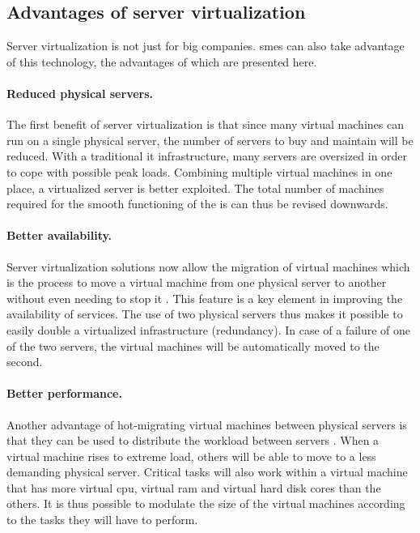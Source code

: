 \subsection{Advantages of server virtualization}
Server virtualization is not just for big companies. \acrshort{sme}s can also take advantage of this technology, the advantages of which are presented here.

\paragraph{Reduced physical servers.} The first benefit of server virtualization is that since many virtual machines can run on a single physical server, the number of servers to buy and maintain will be reduced. With a traditional \acrshort{it} infrastructure, many servers are oversized in order to cope with possible peak loads. Combining multiple virtual machines in one place, a virtualized server is better exploited. The total number of machines required for the smooth functioning of the \acrshort{is} can thus be revised downwards.

\paragraph{Better availability.} Server virtualization solutions now allow the migration of virtual machines which is the process to move a virtual machine from one physical server to another without even needing to stop it \citep{livemigration,livemigration2}. This feature is a key element in improving the availability of services. The use of two physical servers thus makes it possible to easily double a virtualized infrastructure (redundancy). In case of a failure of one of the two servers, the virtual machines will be automatically moved to the second.

\paragraph{Better performance.} Another advantage of hot-migrating virtual machines between physical servers is that they can be used to distribute the workload between servers \citep{livemigration,livemigration2}. When a virtual machine rises to extreme load, others will be able to move to a less demanding physical server. Critical tasks will also work within a virtual machine that has more virtual \acrshort{cpu}, virtual \acrshort{ram} and virtual hard disk cores than the others. It is thus possible to modulate the size of the virtual machines according to the tasks they will have to perform.

